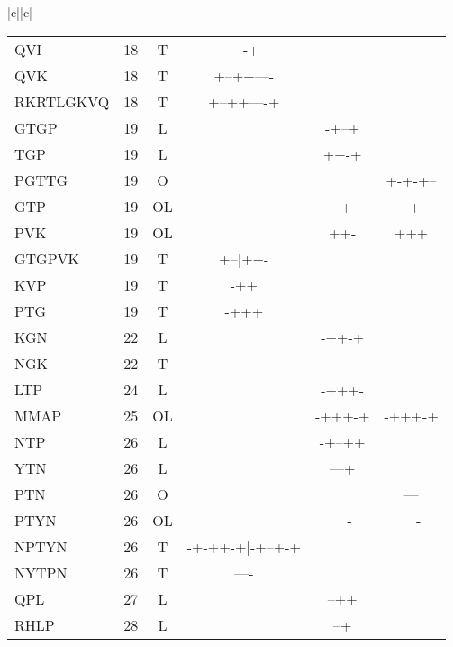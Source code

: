 \documentclass[table,
12pt, %
a4paper, %
oneside, %
headinclude,footinclude, %
BCOR5mm, %
]{scrartcl}
\begin{document}
\begin{table}[htbp]
\begin{adjustbox}{totalheight=\textheight,center}
\begin{tabular}{|c||c|}
\begin{tabular}{l ccccc}
QVI&18&T&----+&&\\
QVK&18&T&+--++----&&\\
RKRTLGKVQ&18&T&+--++----+&&\\
\rowcolor{shadecolor}
GTGP&19&L&&-+--+&\\
TGP&19&L&&++-+&\\
PGTTG&19&O&&&+-+-+--\\
GTP&19&OL&&--+&--+\\
PVK&19&OL&&++-&+++\\
GTGPVK&19&T&+--|++-&&\\
KVP&19&T&-++&&\\
PTG&19&T&-+++&&\\
\rowcolor{lightgray}
KGN&22&L&&-++-+&\\
NGK&22&T&---&&\\
\rowcolor{shadecolor}
LTP&24&L&&-+++-&\\
\rowcolor{lightgray}
MMAP&25&OL&&-+++-+&-+++-+\\
\rowcolor{shadecolor}
NTP&26&L&&-+--++&\\
YTN&26&L&&---+&\\
PTN&26&O&&&---\\
PTYN&26&OL&&----&----\\
NPTYN&26&T&-+-++-+|-+--+-+&&\\
NYTPN&26&T&----&&\\
\rowcolor{shadecolor}
QPL&27&L&&--++&\\
\rowcolor{shadecolor}
RHLP&28&L&&--+&\\
\end{tabular} \\ \hline
\end{tabular}
\end{adjustbox}
\end{table}



\
\renewcommand{\refname}{\spacedlowsmallcaps{References}} %




\end{document}
